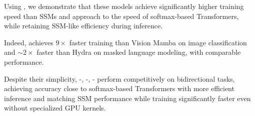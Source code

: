 Using \lion, we demonstrate that these models achieve significantly higher training speed than SSMs and approach to the speed of softmax-based Transformers, while retaining SSM-like efficiency during inference. 

Indeed, \lion achieves $9\times$ faster training than Vision Mamba on image classification and $\sim 2\times$ faster than Hydra on masked language modeling, with comparable performance. 

Despite their simplicity, \lion -, -, - perform competitively on bidirectional tasks, achieving accuracy close to softmax-based Transformers with more efficient inference and matching SSM performance while training significantly faster even without specialized GPU kernels.  
